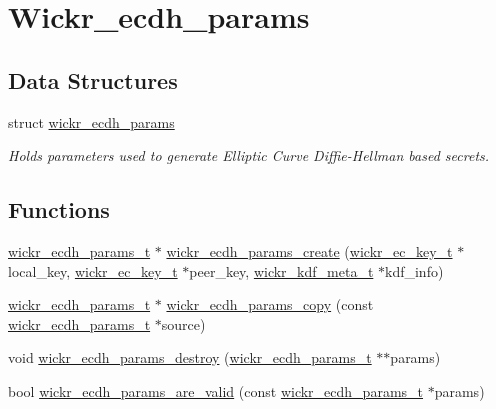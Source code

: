 \hypertarget{group__wickr__ecdh__params}{}\section{Wickr\+\_\+ecdh\+\_\+params}
\label{group__wickr__ecdh__params}
\subsection*{Data Structures}
\begin{DoxyCompactItemize}
\item 
struct \mbox{\hyperlink{structwickr__ecdh__params}{wickr\+\_\+ecdh\+\_\+params}}
\begin{DoxyCompactList}\small\item\em Holds parameters used to generate Elliptic Curve Diffie-\/\+Hellman based secrets. \end{DoxyCompactList}\end{DoxyCompactItemize}
\subsection*{Functions}
\begin{DoxyCompactItemize}
\item 
\mbox{\hyperlink{structwickr__ecdh__params}{wickr\+\_\+ecdh\+\_\+params\+\_\+t}} $\ast$ \mbox{\hyperlink{group__wickr__ecdh__params_ga8a5be72f13caa4bf5ee99e16cc3b092f}{wickr\+\_\+ecdh\+\_\+params\+\_\+create}} (\mbox{\hyperlink{structwickr__ec__key}{wickr\+\_\+ec\+\_\+key\+\_\+t}} $\ast$local\+\_\+key, \mbox{\hyperlink{structwickr__ec__key}{wickr\+\_\+ec\+\_\+key\+\_\+t}} $\ast$peer\+\_\+key, \mbox{\hyperlink{structwickr__kdf__meta}{wickr\+\_\+kdf\+\_\+meta\+\_\+t}} $\ast$kdf\+\_\+info)
\item 
\mbox{\hyperlink{structwickr__ecdh__params}{wickr\+\_\+ecdh\+\_\+params\+\_\+t}} $\ast$ \mbox{\hyperlink{group__wickr__ecdh__params_ga016f2b643f2636c05ed72bc08a0314f0}{wickr\+\_\+ecdh\+\_\+params\+\_\+copy}} (const \mbox{\hyperlink{structwickr__ecdh__params}{wickr\+\_\+ecdh\+\_\+params\+\_\+t}} $\ast$source)
\item 
void \mbox{\hyperlink{group__wickr__ecdh__params_gaf6efcaf58f603e323443063cde9b5621}{wickr\+\_\+ecdh\+\_\+params\+\_\+destroy}} (\mbox{\hyperlink{structwickr__ecdh__params}{wickr\+\_\+ecdh\+\_\+params\+\_\+t}} $\ast$$\ast$params)
\item 
bool \mbox{\hyperlink{group__wickr__ecdh__params_ga801f1bfae11ac0c94d59bf9dd58f78aa}{wickr\+\_\+ecdh\+\_\+params\+\_\+are\+\_\+valid}} (const \mbox{\hyperlink{structwickr__ecdh__params}{wickr\+\_\+ecdh\+\_\+params\+\_\+t}} $\ast$params)
\end{DoxyCompactItemize}


